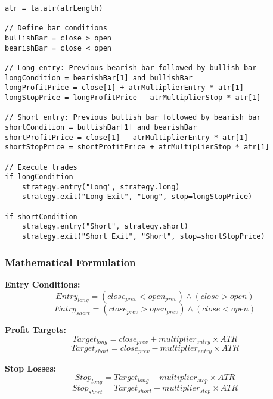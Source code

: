 \documentclass[12pt]{article}
\begin{document}
\begin{lstlisting}[language=Pine, caption=Pine Script Code for One Bar Pursuit Strategy]
atr = ta.atr(atrLength)

// Define bar conditions
bullishBar = close > open
bearishBar = close < open

// Long entry: Previous bearish bar followed by bullish bar
longCondition = bearishBar[1] and bullishBar
longProfitPrice = close[1] + atrMultiplierEntry * atr[1]
longStopPrice = longProfitPrice - atrMultiplierStop * atr[1]

// Short entry: Previous bullish bar followed by bearish bar  
shortCondition = bullishBar[1] and bearishBar
shortProfitPrice = close[1] - atrMultiplierEntry * atr[1]
shortStopPrice = shortProfitPrice + atrMultiplierStop * atr[1]

// Execute trades
if longCondition
    strategy.entry("Long", strategy.long)
    strategy.exit("Long Exit", "Long", stop=longStopPrice)

if shortCondition
    strategy.entry("Short", strategy.short)
    strategy.exit("Short Exit", "Short", stop=shortStopPrice)
\end{lstlisting}

\subsubsection{Mathematical Formulation}
\textbf{Entry Conditions:}
\[
Entry_{long} = (close_{prev} < open_{prev}) \land (close > open)
\]
\[
Entry_{short} = (close_{prev} > open_{prev}) \land (close < open)
\]

\textbf{Profit Targets:}
\[
Target_{long} = close_{prev} + multiplier_{entry} \times ATR
\]
\[
Target_{short} = close_{prev} - multiplier_{entry} \times ATR
\]

\textbf{Stop Losses:}
\[
Stop_{long} = Target_{long} - multiplier_{stop} \times ATR
\]
\[
Stop_{short} = Target_{short} + multiplier_{stop} \times ATR
\]
\end{document}

